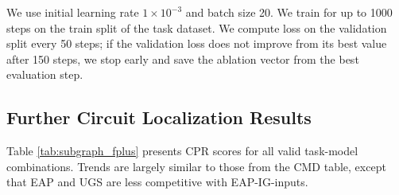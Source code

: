 \documentclass{article}
\theoremstyle{plain}
\theoremstyle{definition}
\theoremstyle{remark}
\begin{document}
We use initial learning rate $1\times10^{-3}$ and batch size 20. We train for up to 1000 steps on the train split of the task dataset. We compute loss on the validation split every 50 steps; if the validation loss does not improve from its best value after 150 steps, we stop early and save the ablation vector from the best evaluation step.

\subsection{Further Circuit Localization Results}\label{app:subgraph-results}
Table \ref{tab:subgraph_fplus} presents \textsf{CPR} scores for all valid task-model combinations. Trends are largely similar to those from the \textsf{CMD} table, except that EAP and UGS are less competitive with EAP-IG-inputs.
\end{document}
